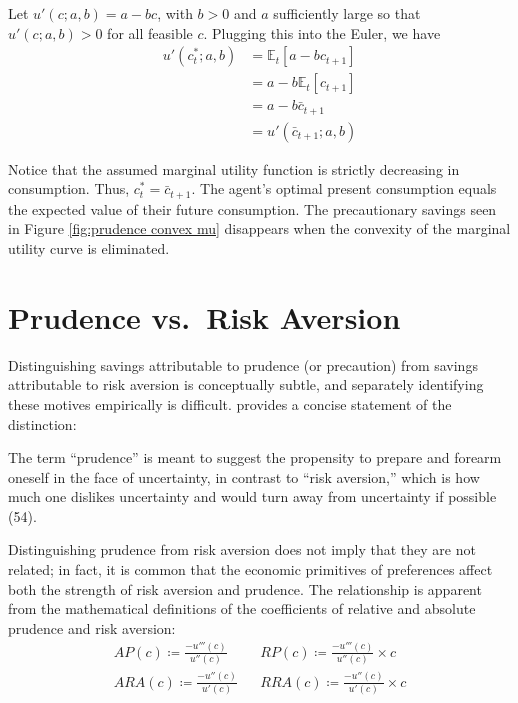 \documentclass[11pt]{article}
\begin{document}
Let $u'(c; a,b) = a - bc$, with $b > 0$ and $a$ sufficiently large so that $u'(c; a,b) > 0$ for all feasible $c$. Plugging this into the Euler, we have
\begin{align*}
    u'(c_t^*; a, b) &= \mathbb{E}_t\!\left[a - bc_{t+1}\right] \\
    &= a - b \mathbb{E}_t\!\left[c_{t+1}\right] \\
    &= a - b \bar{c}_{t+1} \\
    &= u'(\bar{c}_{t+1}; a, b)
\end{align*}

Notice that the assumed marginal utility function is strictly decreasing in consumption. Thus, $c_t^* = \bar{c}_{t+1}$. The agent's optimal present consumption equals the expected value of their future consumption. The precautionary savings seen in Figure \ref{fig:prudence convex mu} disappears when the convexity of the marginal utility curve is eliminated.

\section{Prudence vs.\ Risk Aversion \label{sec:prudence vs aversion}}

Distinguishing savings attributable to prudence (or precaution) from savings attributable to risk aversion is conceptually subtle, and separately identifying these motives empirically is difficult. \textcite{Kimball1990} provides a concise statement of the distinction:

\begin{pullquote}
The term ``prudence'' is meant to suggest the propensity to prepare and forearm oneself in the face of uncertainty, in contrast to ``risk aversion,'' which is how much one dislikes uncertainty and would turn away from uncertainty if possible (54).
\end{pullquote}

Distinguishing prudence from risk aversion does not imply that they are not related; in fact, it is common that the economic primitives of preferences affect both the strength of risk aversion and prudence. The relationship is apparent from the mathematical definitions of the coefficients of relative and absolute prudence and risk aversion:
\begin{align*}
    AP(c) \coloneqq \frac{-u'''(c)}{u''(c)} && RP(c) \coloneqq \frac{-u'''(c)}{u''(c)} \times c \\
    ARA(c) \coloneqq \frac{-u''(c)}{u'(c)} && RRA(c) \coloneqq \frac{-u''(c)}{u'(c)} \times c
\end{align*}
\end{document}
